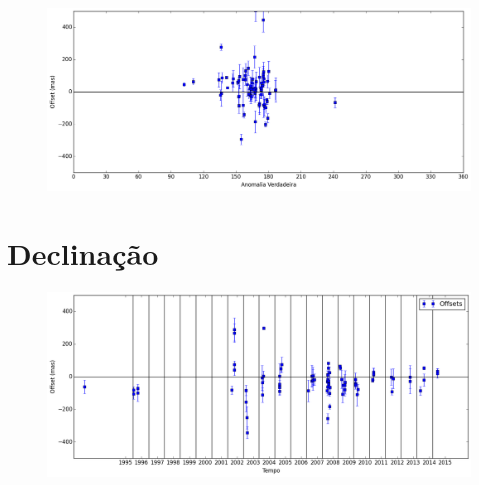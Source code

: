 \documentclass[11pt,a4paper]{report}
\begin{document}
\begin{figure}[h]
\includegraphics[scale=0.45]{Nereida/RA_anom.png}  
\end{figure}


\section*{Declinação}

\begin{figure}[h]
\includegraphics[scale=0.45]{Nereida/DEC.png} 
\end{figure}
\end{document}
